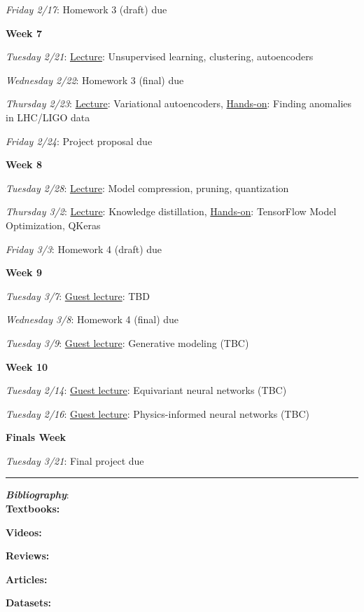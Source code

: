 \documentclass[12pt]{article}
\begin{document}
\emph{Friday 2/17}: Homework 3 (draft) due

\noindent\textbf{Week 7}

\emph{Tuesday 2/21}: \underline{Lecture}: Unsupervised learning, clustering, autoencoders

\emph{Wednesday 2/22}: Homework 3 (final) due

\emph{Thursday 2/23}: \underline{Lecture}: Variational autoencoders, \underline{Hands-on}: Finding anomalies in LHC/LIGO data

\emph{Friday 2/24}: Project proposal due

\noindent\textbf{Week 8}

\emph{Tuesday 2/28}: \underline{Lecture}: Model compression, pruning, quantization

\emph{Thursday 3/2}: \underline{Lecture}: Knowledge distillation, \underline{Hands-on}: TensorFlow Model Optimization, QKeras

\emph{Friday 3/3}: Homework 4 (draft) due

\noindent\textbf{Week 9}

\emph{Tuesday 3/7}: \underline{Guest lecture}: TBD

\emph{Wednesday 3/8}: Homework 4 (final) due

\emph{Tuesday 3/9}: \underline{Guest lecture}: Generative modeling (TBC)

\noindent\textbf{Week 10}

\emph{Tuesday 2/14}: \underline{Guest lecture}: Equivariant neural networks (TBC)

\emph{Tuesday 2/16}: \underline{Guest lecture}: Physics-informed neural networks (TBC)

\noindent\textbf{Finals Week}

\emph{Tuesday 3/21}: Final project due

\begin{center}
	\rule{\textwidth}{0.5pt}
\end{center}

\noindent\textbf{\emph{Bibliography}}:\\

\textbf{Textbooks:}

\newrefsection
\nocite{Mehta:2019,Abu-Mostafa:2012,Erdman:2021,Zeljko:2014,Calafiura:2022,Chollet:2021}
\printbibliography[heading=none]

\textbf{Videos:}

\newrefsection
\nocite{3blue1brown_neuralnetwork,3blue1brown_gradientdescent}
\printbibliography[heading=none]

\textbf{Reviews:}

\newrefsection
\nocite{Carleo:2019ptp}
\printbibliography[heading=none]

\textbf{Articles:}

\newrefsection
\nocite{deOliveira:2015xxd,Aurisano:2016jvx,Komiske:2016rsd,Khan:2018opv,Zhou:2019,Moreno:2019neq,Ormiston:2020ele,Moreno:2021fvp}
\printbibliography[heading=none]

\textbf{Datasets:}

\newrefsection
\nocite{kasieczka_gregor_2019_2603256,hbb_dataset,galaxy-zoo-the-galaxy-challenge,g2net-gravitational-wave-detection,trackml-particle-identification}
\printbibliography[heading=none]
\end{document}
